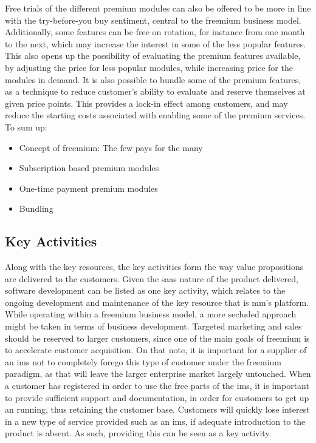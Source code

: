 Free trials of the different premium modules can also be offered to be more in line with the try-before-you buy sentiment, central to the freemium business model. Additionally, some features can be free on rotation, for instance from one month to the next, which may increase the interest in some of the less popular features. This also opens up the possibility of evaluating the premium features available, by adjusting the price for less popular modules, while increasing price for the modules in demand. It is also possible to bundle some of the premium features, as a technique to reduce customer's ability to evaluate and reserve themselves at given price points. This provides a lock-in effect among customers, and may reduce the starting costs associated with enabling some of the premium services. To sum up:

\begin{itemize}
    \item Concept of freemium: The few pays for the many
    \item Subscription based premium modules
    \item One-time payment premium modules
    \item Bundling
\end{itemize}

\subsection{Key Activities}
Along with the key resources, the key activities form the way value propositions are delivered to the customers. Given the \gls{saas} nature of the product delivered, software development can be listed as one key activity, which relates to the ongoing development and maintenance of the key resource that is \gls{mm}'s platform. While operating within a freemium business model, a more secluded approach might be taken in terms of business development. Targeted marketing and sales should be reserved to larger customers, since one of the main goals of freemium is to accelerate customer acquisition. On that note, it is important for a supplier of an \gls{ims} not to completely forego this type of customer under the freemium paradigm, as that will leave the larger enterprise market largely untouched. When a customer has registered in order to use the free parts of the \gls{ims}, it is important to provide sufficient support and documentation, in order for customers to get up an running, thus retaining the customer base. Customers will quickly lose interest in a new type of service provided such as an \gls{ims}, if adequate introduction to the product is absent. As such, providing this can be seen as a key activity. 
\newpage

